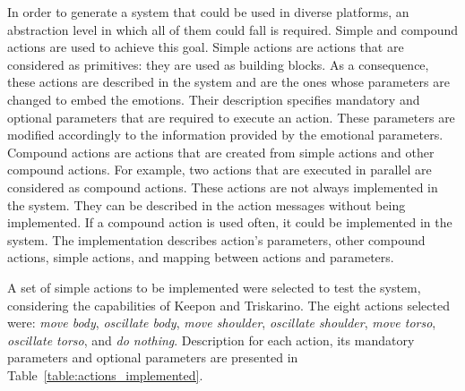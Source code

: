 In order to generate a system that could be used in diverse platforms, an abstraction level in which all of them could fall is required. Simple and compound actions are used to achieve this goal. Simple actions are actions that are considered as primitives: they are used as building blocks. As a consequence, these actions are described in the system and are the ones whose parameters are changed to embed the emotions. Their description specifies mandatory and optional parameters that are required to execute an action. These parameters are modified accordingly to the information provided by the emotional parameters. Compound actions are actions that are created from simple actions and other compound actions. For example, two actions that are executed in parallel are considered as compound actions. These actions are not always implemented in the system. They can be described in the action messages without being implemented. If a compound action is used often, it could be implemented in the system. The implementation describes action's parameters, other compound actions, simple actions, and mapping between actions and parameters.

A set of simple actions to be implemented were selected to test the system, considering the capabilities of Keepon and Triskarino. The eight actions selected were: \textit{move body}, \textit{oscillate body}, \textit{move shoulder}, \textit{oscillate shoulder}, \textit{move torso}, \textit{oscillate torso}, and \textit{do nothing}. Description for each action, its mandatory parameters and optional parameters are presented in Table~\ref{table:actions_implemented}.

